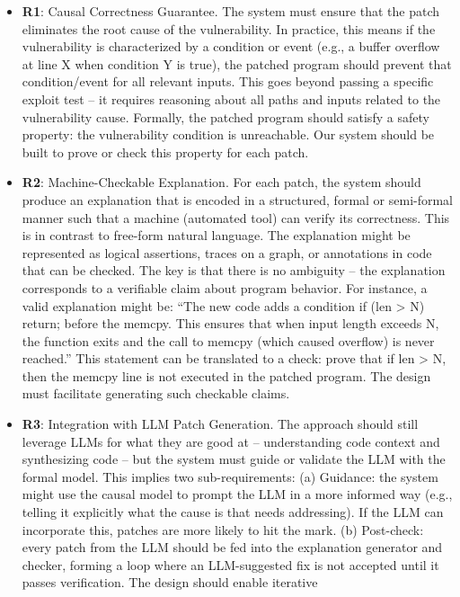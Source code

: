 \documentclass[conference,compsoc]{IEEEtran}
\begin{document}
\begin{itemize}
\item
  \textbf{R1}: Causal Correctness Guarantee. The system must ensure that
  the patch eliminates the root cause of the vulnerability. In practice,
  this means if the vulnerability is characterized by a condition or
  event (e.g., a buffer overflow at line X when condition Y is true),
  the patched program should prevent that condition/event for all
  relevant inputs. This goes beyond passing a specific exploit test --
  it requires reasoning about all paths and inputs related to the
  vulnerability cause. Formally, the patched program should satisfy a
  safety property: the vulnerability condition is unreachable. Our
  system should be built to prove or check this property for each patch.
\item
  \textbf{R2}: Machine-Checkable Explanation. For each patch, the system
  should produce an explanation that is encoded in a structured, formal
  or semi-formal manner such that a machine (automated tool) can verify
  its correctness. This is in contrast to free-form natural language.
  The explanation might be represented as logical assertions, traces on
  a graph, or annotations in code that can be checked. The key is that
  there is no ambiguity -- the explanation corresponds to a verifiable
  claim about program behavior. For instance, a valid explanation might
  be: ``The new code adds a condition if (len \textgreater{} N) return;
  before the memcpy. This ensures that when input length exceeds N, the
  function exits and the call to memcpy (which caused overflow) is never
  reached.'' This statement can be translated to a check: prove that if
  len \textgreater{} N, then the memcpy line is not executed in the
  patched program. The design must facilitate generating such checkable
  claims.
\item
  \textbf{R3}: Integration with LLM Patch Generation. The approach
  should still leverage LLMs for what they are good at -- understanding
  code context and synthesizing code -- but the system must guide or
  validate the LLM with the formal model. This implies two
  sub-requirements: (a) Guidance: the system might use the causal model
  to prompt the LLM in a more informed way (e.g., telling it explicitly
  what the cause is that needs addressing). If the LLM can incorporate
  this, patches are more likely to hit the mark. (b) Post-check: every
  patch from the LLM should be fed into the explanation generator and
  checker, forming a loop where an LLM-suggested fix is not accepted
  until it passes verification. The design should enable iterative

\end{itemize}
\end{document}
